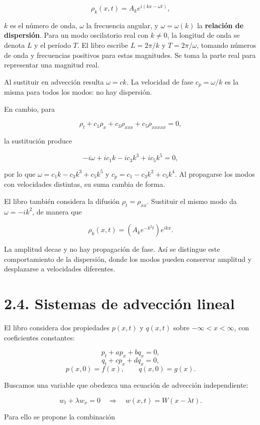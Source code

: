 \documentclass[11pt,a4paper]{article}
\begin{document}
\[\rho_k(x,t)=A_k e^{i(kx-\omega t)},\]

\(k\) es el número de onda, \(\omega\) la frecuencia angular, y
\(\omega=\omega(k)\) la \textbf{relación de dispersión}. Para un modo
oscilatorio real con \(k\ne0\), la longitud de onda se denota \(L\) y el
período \(T\). El libro escribe \(L=2\pi/k\) y \(T=2\pi/\omega\),
tomando números de onda y frecuencias positivos para estas magnitudes.
Se toma la parte real para representar una magnitud real.

Al sustituir en advección resulta \(\omega=ck\). La velocidad de fase
\(c_p=\omega/k\) es la misma para todos los modos: no hay dispersión.

En cambio, para

\[\rho_t+c_1\rho_x+c_3\rho_{xxx}+c_5\rho_{xxxxx}=0,\tag{2.22}\]

la sustitución produce

\[-i\omega+ic_1k-ic_3k^3+ic_5k^5=0,\]

por lo que \(\omega=c_1k-c_3k^3+c_5k^5\) y \(c_p=c_1-c_3k^2+c_5k^4\). Al
propagarse los modos con velocidades distintas, su suma cambia de forma.

El libro también considera la difusión \(\rho_t=\rho_{xx}\). Sustituir
el mismo modo da \(\omega=-ik^2\), de manera que

\[\rho_k(x,t)=(A_k e^{-k^2t})e^{ikx}.\]

La amplitud decae y no hay propagación de fase. Así se distingue este
comportamiento de la dispersión, donde los modos pueden conservar
amplitud y desplazarse a velocidades diferentes.

\hypertarget{sistemas-de-advecciuxf3n-lineal}{%
\section{2.4. Sistemas de advección
lineal}\label{sistemas-de-advecciuxf3n-lineal}}

El libro considera dos propiedades \(p(x,t)\) y \(q(x,t)\) sobre
\(-\infty<x<\infty\), con coeficientes constantes:

\[p_t+ap_x+bq_x=0,\tag{2.23a}\] \[q_t+cp_x+dq_x=0,\tag{2.23b}\]
\[p(x,0)=f(x),\qquad q(x,0)=g(x).\tag{2.23c}\]

Buscamos una variable que obedezca una ecuación de advección
independiente:

\[w_t+\lambda w_x=0\quad\Longrightarrow\quad w(x,t)=W(x-\lambda t).\tag{2.24}\]

Para ello se propone la combinación
\end{document}

